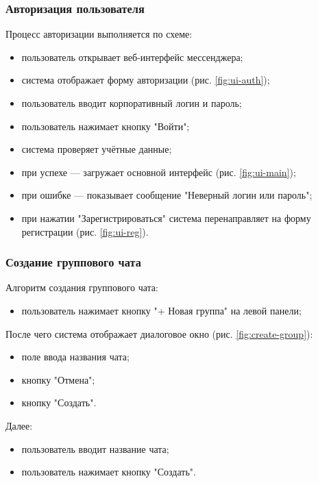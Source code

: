 \subsubsection{Авторизация пользователя}  
Процесс авторизации выполняется по схеме:  
\begin{itemize}  
	\item пользователь открывает веб-интерфейс мессенджера;  
	\item система отображает форму авторизации (рис. \ref{fig:ui-auth});  
	\item пользователь вводит корпоративный логин и пароль;  
	\item пользователь нажимает кнопку "Войти";  
	\item система проверяет учётные данные;
		\item при успехе — загружает основной интерфейс (рис. \ref{fig:ui-main});  
		\item при ошибке — показывает сообщение "Неверный логин или пароль";   
	\item при нажатии "Зарегистрироваться" система перенаправляет на форму регистрации (рис. \ref{fig:ui-reg}).  
\end{itemize}  

\subsubsection{Создание группового чата}  
Алгоритм создания группового чата:  
\begin{itemize}  
	\item пользователь нажимает кнопку "+ Новая группа" на левой панели;
\end{itemize}

После чего система отображает диалоговое окно (рис. \ref{fig:create-group}): 

\begin{itemize}
	\item поле ввода названия чата;
	\item кнопку "Отмена";
	\item кнопку "Создать".
\end{itemize}

Далее:

\begin{itemize}		
	\item пользователь вводит название чата;  
	\item пользователь нажимает кнопку "Создать".
\end{itemize}

